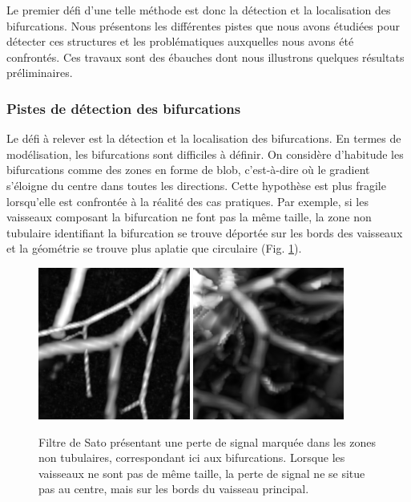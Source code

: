 Le premier défi d'une telle méthode est donc la détection et la localisation des bifurcations. Nous présentons les différentes pistes que nous avons étudiées pour détecter ces structures et les problématiques auxquelles nous avons été confrontés. Ces travaux sont des ébauches dont nous illustrons quelques résultats préliminaires.

\subsubsection{Pistes de détection des bifurcations}
Le défi à relever est la détection et la localisation des bifurcations. En termes de modélisation, les bifurcations sont difficiles à définir. On considère d'habitude les bifurcations comme des zones en forme de blob, c'est-à-dire où le gradient s'éloigne du centre dans toutes les directions. Cette hypothèse est plus fragile lorsqu'elle est confrontée à la réalité des cas pratiques. Par exemple, si les vaisseaux composant la bifurcation ne font pas la même taille, la zone non tubulaire identifiant la bifurcation se trouve déportée sur les bords des vaisseaux et la géométrie se trouve plus aplatie que circulaire (Fig. \ref{fig:gradient_shift}). 
\begin{figure}[!ht]
    \centering
    \includegraphics[height=5cm]{Images/Vascu_2_k_Sato.png}
    \includegraphics[height=5cm]{Images/Ircad_k_Sato.png}
    \caption{Filtre de Sato présentant une perte de signal marquée dans les zones non tubulaires, correspondant ici aux bifurcations. Lorsque les vaisseaux ne sont pas de même taille, la perte de signal ne se situe pas au centre, mais sur les bords du vaisseau principal.}
    \label{fig:gradient_shift}
\end{figure}

